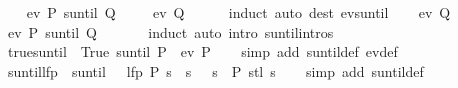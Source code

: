 \begin{isabellebody}
%
\endisadelimproof
%
\isatagproof
{}\isamarkupfalse%
\isanewline
\ \ \isamarkupfalse%
\ {\isachardoublequoteopen}ev\ {\isacharparenleft}P\ suntil\ Q{\isacharparenright}\ {\isasymomega}{\isachardoublequoteclose}\ \isamarkupfalse%
\ \isamarkupfalse%
\ {\isachardoublequoteopen}ev\ Q\ {\isasymomega}{\isachardoublequoteclose}\isanewline
\ \ \ \isamarkupfalse%
\ induct\ {\isacharparenleft}auto\ dest{\isacharcolon}\ ev{\isacharunderscore}suntil{\isacharparenright}\isanewline
{}\isamarkupfalse%
\isanewline
\ \ \isamarkupfalse%
\ {\isachardoublequoteopen}ev\ Q\ {\isasymomega}{\isachardoublequoteclose}\ \isamarkupfalse%
\ \isamarkupfalse%
\ {\isachardoublequoteopen}ev\ {\isacharparenleft}P\ suntil\ Q{\isacharparenright}\ {\isasymomega}{\isachardoublequoteclose}\isanewline
\ \ \ \ \isamarkupfalse%
\ induct\ {\isacharparenleft}auto\ intro{\isacharcolon}\ suntil{\isachardot}intros{\isacharparenright}\isanewline
{}\isamarkupfalse%
%
\endisatagproof
{\isafoldproof}%
%
\isadelimproof
\isanewline
%
\endisadelimproof
\isanewline
{}\isamarkupfalse%
\ true{\isacharunderscore}suntil{\isacharcolon}\ {\isachardoublequoteopen}{\isacharparenleft}{\isacharparenleft}{\isasymlambda}{\isacharunderscore}{\isachardot}\ True{\isacharparenright}\ suntil\ P{\isacharparenright}\ {\isacharequal}\ ev\ P{\isachardoublequoteclose}\isanewline
%
\isadelimproof
\ \ %
\endisadelimproof
%
\isatagproof
{}\isamarkupfalse%
\ {\isacharparenleft}simp\ add{\isacharcolon}\ suntil{\isacharunderscore}def\ ev{\isacharunderscore}def{\isacharparenright}%
\endisatagproof
{\isafoldproof}%
%
\isadelimproof
\isanewline
%
\endisadelimproof
\isanewline
{}\isamarkupfalse%
\ suntil{\isacharunderscore}lfp{\isacharcolon}\ {\isachardoublequoteopen}{\isacharparenleft}{\isasymphi}\ suntil\ {\isasympsi}{\isacharparenright}\ {\isacharequal}\ lfp\ {\isacharparenleft}{\isasymlambda}P\ s{\isachardot}\ {\isasympsi}\ s\ {\isasymor}\ {\isacharparenleft}{\isasymphi}\ s\ {\isasymand}\ P\ {\isacharparenleft}stl\ s{\isacharparenright}{\isacharparenright}{\isacharparenright}{\isachardoublequoteclose}\isanewline
%
\isadelimproof
\ \ %
\endisadelimproof
%
\isatagproof
{}\isamarkupfalse%
\ {\isacharparenleft}simp\ add{\isacharcolon}\ suntil{\isacharunderscore}def{\isacharparenright}%
\endisatagproof
{\isafoldproof}%
%
\isadelimproof
\isanewline
%
\endisadelimproof
\isanewline
{}\isamarkupfalse%

\end{isabellebody}
